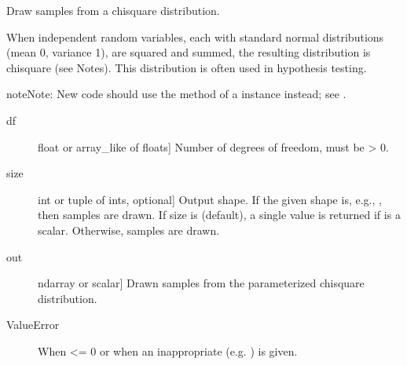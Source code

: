 \documentclass[letterpaper,10pt,english]{sphinxmanual}
\begin{document}

\begin{fulllineitems}
\label{\detokenize{infrapy.utils:infrapy.utils.ref2sac.chisquare}}
Draw samples from a chi\sphinxhyphen{}square distribution.

When  independent random variables, each with standard normal
distributions (mean 0, variance 1), are squared and summed, the
resulting distribution is chi\sphinxhyphen{}square (see Notes).  This distribution
is often used in hypothesis testing.

\begin{sphinxadmonition}{note}{Note:}
New code should use the  method of a 
instance instead; see .
\end{sphinxadmonition}
\begin{description}
\item[{df}] \leavevmode{[}float or array\_like of floats{]}
Number of degrees of freedom, must be \textgreater{} 0.

\item[{size}] \leavevmode{[}int or tuple of ints, optional{]}
Output shape.  If the given shape is, e.g., , then
 samples are drawn.  If size is  (default),
a single value is returned if  is a scalar.  Otherwise,
 samples are drawn.

\end{description}
\begin{description}
\item[{out}] \leavevmode{[}ndarray or scalar{]}
Drawn samples from the parameterized chi\sphinxhyphen{}square distribution.

\end{description}
\begin{description}
\item[{ValueError}] \leavevmode
When  \textless{}= 0 or when an inappropriate  (e.g. )
is given.


\end{description}
\end{fulllineitems}
\end{document}

